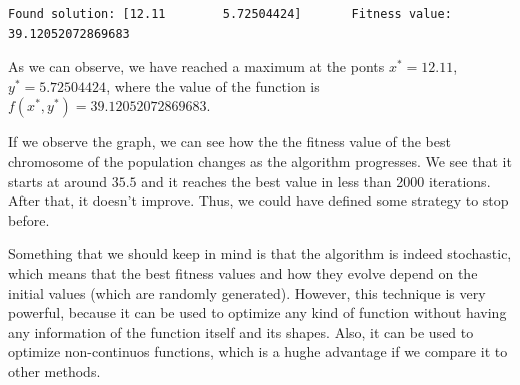\documentclass[11pt]{article}
\begin{document}
    \begin{Verbatim}[commandchars=\\\{\}]
Found solution: [12.11        5.72504424]       Fitness value: 39.12052072869683
    \end{Verbatim}

    As we can observe, we have reached a maximum at the ponts
\(x^* = 12.11\), \(y^* = 5.72504424\), where the value of the function
is \(f(x^*, y^*) = 39.12052072869683\).

If we observe the graph, we can see how the the fitness value of the
best chromosome of the population changes as the algorithm progresses.
We see that it starts at around \(35.5\) and it reaches the best value
in less than 2000 iterations. After that, it doesn't improve. Thus, we
could have defined some strategy to stop before.

Something that we should keep in mind is that the algorithm is indeed
stochastic, which means that the best fitness values and how they evolve
depend on the initial values (which are randomly generated). However,
this technique is very powerful, because it can be used to optimize any
kind of function without having any information of the function itself
and its shapes. Also, it can be used to optimize non-continuos
functions, which is a hughe advantage if we compare it to other methods.


    
    
    
\end{document}
